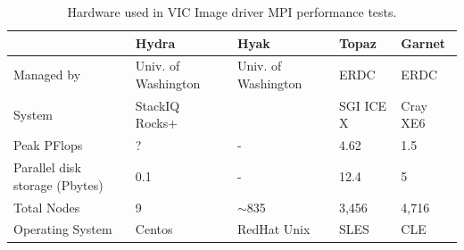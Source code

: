 \documentclass[gmd, manuscript]{copernicus}
\begin{document}
\clearpage
\begin{table}[]
  \centering
  \caption{Hardware used in VIC Image driver MPI performance tests.}
  \label{table:hardware}
  \begin{tabular}{|l|l|l|l|l|}
  \hline
                                  & Hydra                                      & Hyak                                         & Topaz                                                                                                            & Garnet                                     \\ \hline
  Managed by                      & Univ. of Washington                        & Univ. of Washington                          & ERDC                                                                                                             & ERDC                                       \\ \hline
  System                          & StackIQ Rocks+                             &                                              & SGI ICE X                                                                                                        & Cray XE6                                   \\ \hline
  Peak PFlops                     & ?                                          & -                                            & 4.62                                                                                                             & 1.5                                        \\ \hline
  Parallel disk storage (Pbytes)  & 0.1                                        & -                                            & 12.4                                                                                                             & 5                                          \\ \hline
  Total Nodes                     & 9                                          & $\sim$835                                    & 3,456                                                                                                            & 4,716                                      \\ \hline
  Operating System                & Centos                                     & RedHat Unix                                  & SLES                                                                                                             & CLE                                        \\ \hline

\end{tabular}
\end{table}
\end{document}
